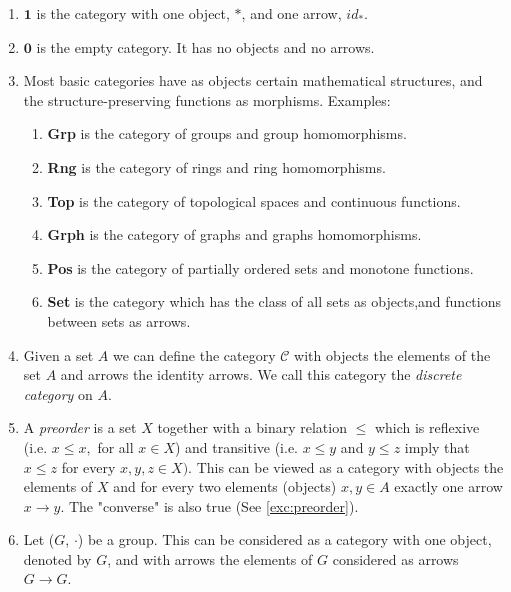 \documentclass[11pt]{article}
\theoremstyle{plain}
\theoremstyle{definition}
\theoremstyle{remark}
\newcommand{\cC}{\mathcal{C}}
\begin{document}
\begin{examples}
\begin{enumerate}
    \item $\mathbf{1}$ is the category with one object,
    $*$, and one arrow, $id_{*}$.
    \item $\mathbf{0}$ is the empty category. It has no objects
    and no arrows.
    \item Most basic categories have as objects certain mathematical
    structures, and the structure-preserving functions as morphisms. Examples:
    \begin{enumerate}
        \item \textbf{Grp} is the category of groups and group homomorphisms.
        \item \textbf{Rng} is the category of rings and ring homomorphisms.
        \item \textbf{Top} is the category of topological spaces and continuous
        functions.
        \item \textbf{Grph} is the category of graphs and graphs homomorphisms.
        \item \textbf{Pos} is the category of partially ordered sets and monotone
        functions.
         \item \textbf{Set} is the category which has the class of all sets as
         objects,and functions between sets as arrows.
    \end{enumerate}
    
    \item Given a set $A$ we can define the category $\cC$ with objects
    the elements of the set $A$ and arrows the identity arrows.
    We call this category the {\em discrete category} on $A$.
    
    \item \label{example:preorder}
    A {\em preorder} is a set $X$ together with a binary
    relation $\leq$ which is reflexive (i.e. $x\leq x,$ for all $x\in
    X$)
    and transitive (i.e. $x\leq y$ and $y \leq z$ imply that $x\leq z$
    for every $x,y,z \in X).$ This can be viewed as a category with
    objects the elements of $X$ and for every two elements (objects)
    $x,y\in A$ exactly one arrow $x\to y$.
    The "converse" is also true (See \autoref{exc:preorder}).
   
    \item Let ($G$, $\cdot$) be a group. This can be considered as
    a category with one object, denoted by $G$, and with arrows the
    elements of $G$ considered as arrows $G\to G$.
   
\end{enumerate}
\end{examples}
\end{document}
